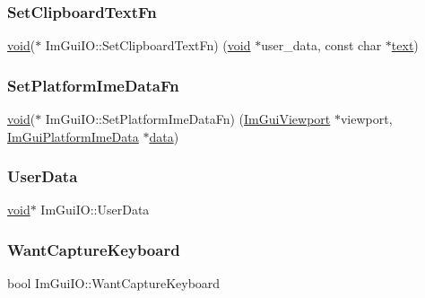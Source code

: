 \subsubsection{\texorpdfstring{Set\+Clipboard\+Text\+Fn}{SetClipboardTextFn}}
{\footnotesize\ttfamily \hyperlink{imgui__impl__opengl3__loader_8h_ac668e7cffd9e2e9cfee428b9b2f34fa7}{void}($\ast$ Im\+Gui\+I\+O\+::\+Set\+Clipboard\+Text\+Fn) (\hyperlink{imgui__impl__opengl3__loader_8h_ac668e7cffd9e2e9cfee428b9b2f34fa7}{void} $\ast$user\+\_\+data, const char $\ast$\hyperlink{game__play__state_8cpp_a295b62c787445f811e691da4b10f6be4}{text})}

\mbox{\label{structImGuiIO_a000283dfba912e6af1b607ea19677fd2}} 
\subsubsection{\texorpdfstring{Set\+Platform\+Ime\+Data\+Fn}{SetPlatformImeDataFn}}
{\footnotesize\ttfamily \hyperlink{imgui__impl__opengl3__loader_8h_ac668e7cffd9e2e9cfee428b9b2f34fa7}{void}($\ast$ Im\+Gui\+I\+O\+::\+Set\+Platform\+Ime\+Data\+Fn) (\hyperlink{structImGuiViewport}{Im\+Gui\+Viewport} $\ast$viewport, \hyperlink{structImGuiPlatformImeData}{Im\+Gui\+Platform\+Ime\+Data} $\ast$\hyperlink{imgui__impl__opengl3__loader_8h_abd87654504355b4c1bb002dcb1d4d16a}{data})}

\mbox{\label{structImGuiIO_a8c5e74fd39c2655455329e09529da7d3}} 
\subsubsection{\texorpdfstring{User\+Data}{UserData}}
{\footnotesize\ttfamily \hyperlink{imgui__impl__opengl3__loader_8h_ac668e7cffd9e2e9cfee428b9b2f34fa7}{void}$\ast$ Im\+Gui\+I\+O\+::\+User\+Data}

\mbox{\label{structImGuiIO_a458e4ca98d896adb16e3a41ec6d2b811}} 
\subsubsection{\texorpdfstring{Want\+Capture\+Keyboard}{WantCaptureKeyboard}}
{\footnotesize\ttfamily bool Im\+Gui\+I\+O\+::\+Want\+Capture\+Keyboard}

